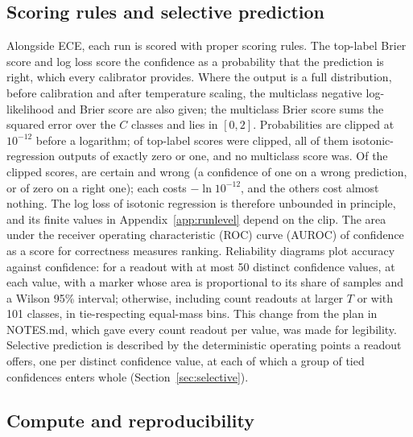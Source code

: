 \documentclass[10pt]{article}
\begin{document}
\subsection{Scoring rules and selective prediction}
\label{sec:scoring}

Alongside ECE, each run is scored with proper scoring rules. The top-label Brier score and log loss
score the confidence as a probability that the prediction is right, which every calibrator
provides. Where the output is a full distribution, before calibration and after temperature
scaling, the multiclass negative log-likelihood and Brier score are also given; the multiclass
Brier score sums the squared error over the $C$ classes and lies in $[0,2]$. Probabilities are
clipped at $10^{-12}$ before a logarithm; \clipTop{} of \clipTopTotal{} top-label scores were %
clipped, all of them isotonic-regression outputs of exactly zero or one, and no multiclass score
was. Of the clipped scores, \penalisedTop{} are certain and wrong (a confidence of one on a wrong %
prediction, or of zero on a right one); each costs $-\ln 10^{-12}$, and the others cost almost
nothing. The log loss of isotonic regression is therefore unbounded in principle, and its finite
values in Appendix~\ref{app:runlevel} depend on the clip. The area
under the receiver operating characteristic (ROC) curve (AUROC) of confidence as a score for correctness measures ranking. Reliability
diagrams plot accuracy against confidence: for a readout with at most 50 distinct confidence
values, at each value, with a marker whose area is proportional to its share of samples and a
Wilson 95\% interval; otherwise, including count readouts at larger $T$ or with 101 classes, in
tie-respecting equal-mass bins. This change from the plan in NOTES.md, which gave every count
readout per value, was made for legibility. Selective prediction is
described by the deterministic operating points a readout offers, one per distinct confidence
value, at each of which a group of tied confidences enters whole (Section~\ref{sec:selective}).

\subsection{Compute and reproducibility}
\label{sec:compute}
\end{document}
